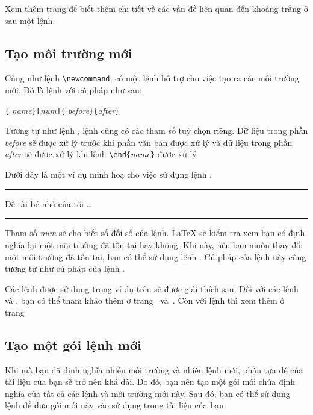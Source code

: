Xem thêm trang \pageref{khoảng trắng} để biết thêm chi tiết về các vấn đề liên quan đến khoảng trắng ở sau một lệnh.

\subsection{Tạo môi trường mới}
Cũng như lệnh \verb|\newcommand|, có một lệnh hỗ trợ cho việc tạo ra các môi trường mới. Đó là lệnh  với cú pháp như sau:

\begin{lscommand}
\verb|{|%
       \emph{name}\verb|}[|\emph{num}\verb|]{|%
       \emph{before}\verb|}{|\emph{after}\verb|}|
\end{lscommand}
Tương tự như lệnh , lệnh  cũng có các tham số tuỳ chọn riêng. Dữ liệu trong phần \emph{before} sẽ được xử lý trước khi phần văn bản được xử lý và dữ liệu trong phần \emph{after} sẽ được xử lý khi lệnh
\verb|\end{|\emph{name}\verb|}| được xử lý.

Dưới đây là một ví dụ minh hoạ cho việc sử dụng lệnh .

\begin{example}
\newenvironment{king}
 {\rule{1ex}{1ex}%
      \hspace{\stretch{1}}}
 {%
      \rule{1ex}{1ex}}

\begin{king}
Đề tài bé nhỏ của tôi \ldots
\end{king}
\end{example}
Tham số \emph{num} sẽ cho biết số đối số của lệnh. \LaTeX{} sẽ kiểm tra xem bạn có định nghĩa lại một môi trường đã tồn tại hay không. Khi này, nếu bạn muốn thay đổi một môi trường đã tồn tại, bạn có thể sử dụng lệnh . Cú pháp của lệnh này cũng tương tự như cú pháp của lệnh .

Các lệnh được sử dụng trong ví dụ trên sẽ được giải thích sau. Đối với các lệnh  và , bạn có thể tham khảo thêm ở trang~\pageref{cmd:rule} và~\pageref{sec:rule}. Còn với lệnh  thì xem thêm ở trang~\pageref{sec:hspace}

\subsection{Tạo một gói lệnh mới}
Khi mà bạn đã định nghĩa nhiều môi trường và nhiều lệnh mới, phần tựa đề của tài liệu của bạn sẽ trở nên khá dài. Do đó, bạn nên tạo một gói mới chứa định nghĩa của tất cả các lệnh và môi trường mới này. Sau đó, bạn có thể sử dụng lệnh  để đưa gói mới này vào sử dụng trong tài liệu của bạn.

